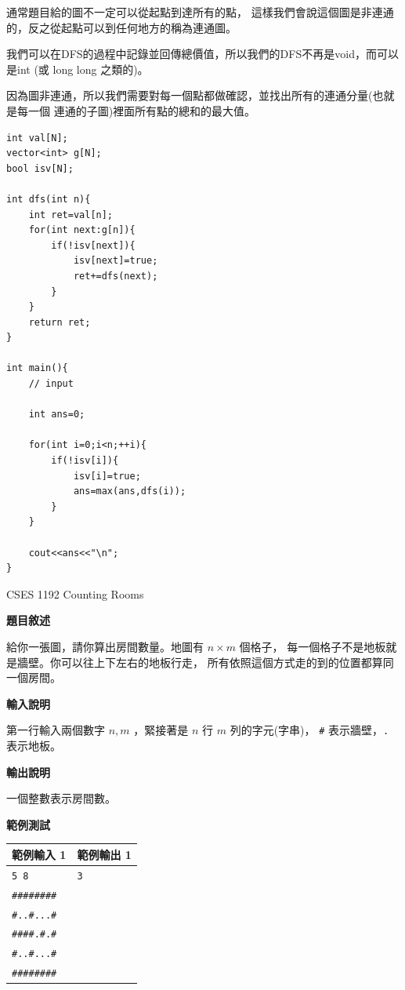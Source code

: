     \begin{tip}
        通常題目給的圖不一定可以從起點到達所有的點，
        這樣我們會說這個圖是非連通的，反之從起點可以到任何地方的稱為連通圖。
    \end{tip}

    我們可以在DFS的過程中記錄並回傳總價值，所以我們的DFS不再是void，而可以是int
    (或 long long 之類的)。

    因為圖非連通，所以我們需要對每一個點都做確認，並找出所有的連通分量(也就是每一個
    連通的子圖)裡面所有點的總和的最大值。

\begin{lstlisting}[caption=開車蒐集寶物題解]
int val[N];
vector<int> g[N];
bool isv[N];
    
int dfs(int n){
    int ret=val[n];
    for(int next:g[n]){
        if(!isv[next]){
            isv[next]=true;
            ret+=dfs(next);
        }
    }
    return ret;
}
    
int main(){
    // input
    
    int ans=0;
    
    for(int i=0;i<n;++i){
        if(!isv[i]){
            isv[i]=true;
            ans=max(ans,dfs(i));
        }
    }
    
    cout<<ans<<"\n";
}
\end{lstlisting}

    \problem CSES 1192 Counting Rooms

    \textbf{題目敘述}

    給你一張圖，請你算出房間數量。地圖有 $n \times m$ 個格子，
    每一個格子不是地板就是牆壁。你可以往上下左右的地板行走，
    所有依照這個方式走的到的位置都算同一個房間。

    \textbf{輸入說明}

    第一行輸入兩個數字 $n,m$ ，緊接著是 $n$ 行 $m$ 列的字元(字串)， \verb|#| 表示牆壁，\verb|.| 表示地板。
    
    \textbf{輸出說明}

    一個整數表示房間數。

    \textbf{範例測試}

    \begin{tabular}{|m{7cm}|m{7cm}|}
        \hline
        範例輸入 1 & 範例輸出 1 \\
        \hline
        \verb|5 8|  & \verb|3| \\
        \verb|########|  & \\
        \verb|#..#...#|  & \\
        \verb|####.#.#|  & \\
        \verb|#..#...#|  & \\
        \verb|########| & \\
        \hline
    \end{tabular}

